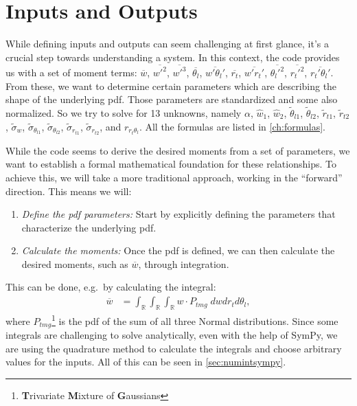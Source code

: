 \section{Inputs and Outputs}\label{sec:inputsandoutputs}

While defining inputs and outputs can seem challenging at first glance, it's a crucial step towards understanding a system.
In this context, the code provides us with a set of moment terms: $\overline{w}$, $\overline{w'^2}$, $\overline{w'^3}$, $\overline{\theta_l}$, $\overline{w'\theta_l'}$, $\overline{r_t}$, $\overline{w' r_t'}$, $\overline{\theta_l'^2}$, $\overline{r_t'^2}$, $\overline{r_t'\theta_l'}$.
From these, we want to determine certain parameters which are describing the shape of the underlying \gls{pdf}.
Those parameters are standardized and some also normalized.
So we try to solve for 13 unknowns, namely $\alpha$, $\widehat{w}_1$, $\widehat{w}_2$, $\tilde{\theta}_{l1}$, $\tilde{\theta}_{l2}$, $\tilde{r}_{t1}$, $\tilde{r}_{t2}$, $\tilde{\sigma}_w$, $\tilde{\sigma}_{\theta_{l1}}$, $\tilde{\sigma}_{\theta_{l2}}$, $\tilde{\sigma}_{r_{t1}}$, $\tilde{\sigma}_{r_{t2}}$, and $r_{r_t \theta_l}$.
All the formulas are listed in \cref{ch:formulas}.

While the code seems to derive the desired moments from a set of parameters, we want to establish a formal mathematical foundation for these relationships.
To achieve this, we will take a more traditional approach, working in the \enquote{forward} direction.
This means we will:
\begin{enumerate}
    \item \emph{Define the \gls{pdf} parameters:}
    Start by explicitly defining the parameters that characterize the underlying \gls{pdf}.
    \item \emph{Calculate the moments:}
    Once the \gls{pdf} is defined, we can then calculate the desired moments, such as $\overline{w}$, through integration.
\end{enumerate}
This can be done, e.g.\ by calculating the integral:
\begin{align}
    \overline{w}
    &= \int_{\mathbb{R}} \int_{\mathbb{R}} \int_{\mathbb{R}} w \cdot P_{tmg} \; dw dr_t d\theta_l,
\end{align}
where $P_{tmg}$\footnote{\textbf{T}rivariate \textbf{M}ixture of \textbf{G}aussians} is the \gls{pdf} of the sum of all three Normal distributions.
Since some integrals are challenging to solve analytically, even with the help of SymPy, we are using the quadrature method to calculate the integrals and choose arbitrary values for the inputs.
All of this can be seen in \cref{sec:numintsympy}.

